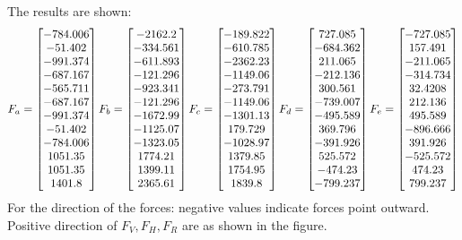 \documentclass{article}
\begin{document}
The results are shown: \\
\begin{align*}
F_a= \begin{bmatrix} 	-784.006 \\ -51.402 \\ -991.374 \\ -687.167 \\ -565.711 \\ -687.167 \\
			-991.374 \\ -51.402 \\ -784.006 \\ 1051.35 \\ 1051.35 \\1401.8 \\  \end{bmatrix}
F_b= \begin{bmatrix} 	-2162.2 \\ -334.561 \\ -611.893 \\ -121.296 \\ -923.341 \\ -121.296 \\ 
			-1672.99 \\ -1125.07 \\ -1323.05 \\ 1774.21 \\ 1399.11 \\ 2365.61 \\ \end{bmatrix}
F_c=\begin{bmatrix} 	-189.822 \\ -610.785 \\ -2362.23 \\ -1149.06 \\ -273.791 \\ -1149.06 \\
			 -1301.13 \\ 179.729 \\ -1028.97 \\ 1379.85 \\ 1754.95 \\ 1839.8 \\ \end{bmatrix}
F_d=\begin{bmatrix} 	727.085 \\ -684.362 \\ 211.065 \\ -212.136 \\ 300.561 \\ -739.007 \\ 
			-495.589 \\ 369.796 \\ -391.926 \\ 525.572 \\ -474.23 \\ -799.237 \\ \end{bmatrix}
F_e=\begin{bmatrix} 	-727.085 \\ 157.491 \\ -211.065 \\ -314.734 \\ 32.4208 \\ 212.136 \\ 
			495.589 \\ -896.666 \\ 391.926 \\ -525.572 \\ 474.23 \\ 799.237 \\  \end{bmatrix}
\end{align*} 
For the direction of the forces:  negative values indicate forces point outward. Positive direction of $F_V, F_H, F_R $ are as shown in the figure. 
\end{document}
